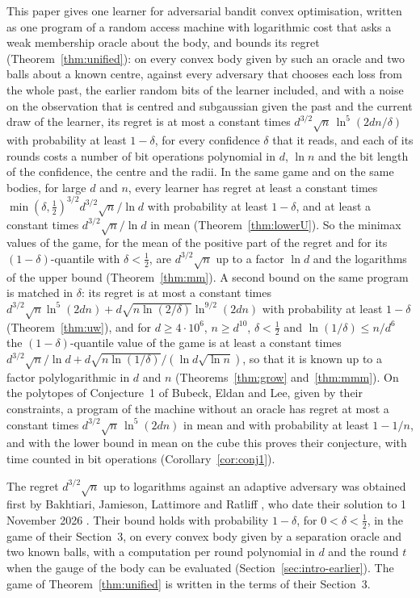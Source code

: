 \documentclass[11pt]{amsart}
\theoremstyle{definition}
\numberwithin{equation}{section}
\begin{document}
This paper gives one learner for adversarial bandit convex optimisation, written as one program of a random access machine with logarithmic cost that asks a weak membership oracle about the body, and bounds its regret (Theorem~\ref{thm:unified}): on every convex body given by such an oracle and two balls about a known centre, against every adversary that chooses each loss from the whole past, the earlier random bits of the learner included, and with a noise on the observation that is centred and subgaussian given the past and the current draw of the learner, its regret is at most a constant times $d^{3/2}\sqrt n\,\ln^5(2dn/\delta)$ with probability at least $1-\delta$, for every confidence $\delta$ that it reads, and each of its rounds costs a number of bit operations polynomial in $d$, $\ln n$ and the bit length of the confidence, the centre and the radii. In the same game and on the same bodies, for large $d$ and $n$, every learner has regret at least a constant times $\min(\delta,\frac12)^{3/2}d^{3/2}\sqrt n/\ln d$ with probability at least $1-\delta$, and at least a constant times $d^{3/2}\sqrt n/\ln d$ in mean (Theorem~\ref{thm:lowerU}). So the minimax values of the game, for the mean of the positive part of the regret and for its $(1-\delta)$-quantile with $\delta<\frac12$, are $d^{3/2}\sqrt n$ up to a factor $\ln d$ and the logarithms of the upper bound (Theorem~\ref{thm:mm}). A second bound on the same program is matched in $\delta$: its regret is at most a constant times $d^{3/2}\sqrt n\ln^5(2dn)+d\sqrt{n\ln(2/\delta)}\ln^{9/2}(2dn)$ with probability at least $1-\delta$ (Theorem~\ref{thm:uw}), and for $d\ge4\cdot10^6$, $n\ge d^{10}$, $\delta<\frac12$ and $\ln(1/\delta)\le n/d^6$ the $(1-\delta)$-quantile value of the game is at least a constant times $d^{3/2}\sqrt n/\ln d+d\sqrt{n\ln(1/\delta)}/(\ln d\sqrt{\ln n})$, so that it is known up to a factor polylogarithmic in $d$ and $n$ (Theorems~\ref{thm:grow} and~\ref{thm:mmm}). On the polytopes of Conjecture~1 of Bubeck, Eldan and Lee, given by their constraints, a program of the machine without an oracle has regret at most a constant times $d^{3/2}\sqrt n\,\ln^5(2dn)$ in mean and with probability at least $1-1/n$, and with the lower bound in mean on the cube this proves their conjecture, with time counted in bit operations (Corollary~\ref{cor:conj1}).

The regret $d^{3/2}\sqrt n$ up to logarithms against an adaptive adversary was obtained first by Bakhtiari, Jamieson, Lattimore and Ratliff \cite[Theorem~2 and Proposition~13]{BJLR26}, who date their solution to 1 November 2026 \cite[Section~6]{BJLR26}. Their bound holds with probability $1-\delta$, for $0<\delta<\frac12$, in the game of their Section~3, on every convex body given by a separation oracle and two known balls, with a computation per round polynomial in $d$ and the round $t$ when the gauge of the body can be evaluated (Section~\ref{sec:intro-earlier}). The game of Theorem~\ref{thm:unified} is written in the terms of their Section~3.
\end{document}
